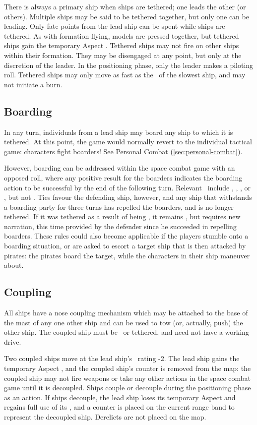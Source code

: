 There is always a primary ship when ships are tethered; one leads the other (or others). Multiple ships may be said to be tethered together, but only one can be leading. Only fate points from the lead ship can be spent while ships are tethered. As with formation flying, models are pressed together, but tethered ships gain the temporary Aspect . Tethered ships may not fire on other ships within their formation. They may be disengaged at any point, but only at the discretion of the leader. In the positioning phase, only the leader makes a piloting roll. Tethered ships may only move as fast as the \Vshift\ of the slowest ship, and may not initiate a burn.

\subsection{Boarding}
\label{sec:boarding}

In any turn, individuals from a lead ship may board any ship to which it is tethered. At this point, the game would normally revert to the individual tactical game: characters fight boarders! See Personal Combat (\autoref{sec:personal-combat}).

However, boarding can be addressed within the space combat game with an opposed roll, where any positive result for the boarders indicates the boarding action to be successful by the end of the following turn. Relevant \Aspects\ include , , , or , but not . Ties favour the defending ship, however, and any ship that withstands a boarding party for three turns has repelled the boarders, and is no longer tethered. If it was tethered as a result of being \TakenOut, it remains \TakenOut, but requires new narration, this time provided by the defender since he succeeded in repelling boarders. These rules could also become applicable if the players stumble onto a boarding situation, or are asked to escort a target ship that is then attacked by pirates: the pirates board the target, while the characters in their ship maneuver about.

\subsection{Coupling}
\label{sec:coupling}

All ships have a nose coupling mechanism which may be attached to the base of the mast of any one other ship and can be used to tow (or, actually, push) the other ship. The coupled ship must be \TakenOut\ or tethered, and need not have a working drive.

Two coupled ships move at the lead ship's \Vshift\ rating -2. The lead ship gains the temporary Aspect , and the coupled ship's counter is removed from the map: the coupled ship may not fire weapons or take any other actions in the space combat game until it is decoupled. Ships couple or decouple during the positioning phase as an action. If ships decouple, the lead ship loses its temporary Aspect and regains full use of its \Vshift, and a counter is placed on the current range band to represent the decoupled ship. Derelicts are not placed on the map.

